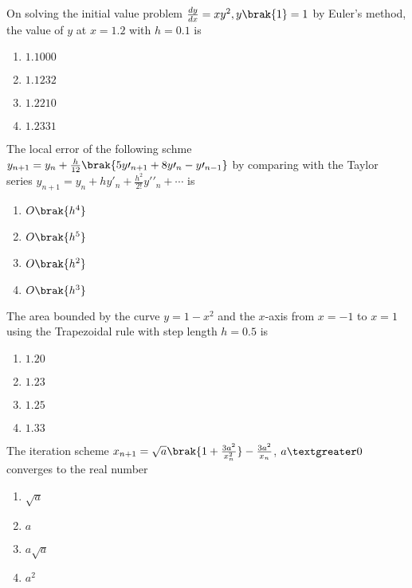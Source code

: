 \item{
On solving the initial value problem $\frac{dy}{dx}=xy^2,y\brak{1}=1$ by Euler's method, the value of $y$ at $x=1.2$ with $h=0.1$ is
\begin{multicols}{4}
\begin{enumerate}
\item $1.1000$
\item $1.1232$
\item $1.2210$
\item $1.2331$
\end{enumerate}
\end{multicols}
}
\item{
The local error of the following schme $y_{n+1}=y_n+\frac{h}{12}\brak{5y\prime_{n+1} + 8y\prime_n - y\prime_{n-1}}$ by comparing with the Taylor series $y_{n+1} = y_n + hy\prime_n + \frac{h^2}{2!}y\prime\prime_n + \cdots$ is 
\begin{multicols}{4}
\begin{enumerate}
\item $O\brak{h^4}$
\item $O\brak{h^5}$
\item $O\brak{h^2}$
\item $O\brak{h^3}$
\end{enumerate}
\end{multicols}
}
\item{
The area bounded by the curve $y=1-x^2$ and the $x$-axis from $x=-1$ to $x=1$ using the Trapezoidal rule with step length $h=0.5$ is
\begin{multicols}{4}
\begin{enumerate}
\item $1.20$
\item $1.23$
\item $1.25$
\item $1.33$
\end{enumerate}
\end{multicols}
}
\item{
The iteration scheme $x_{n+1}=\sqrt{a}\brak{1+\frac{3a^2}{x_n^2}}-\frac{3a^2}{x_n}$, $a\textgreater0$ converges to the real number
\begin{multicols}{4}
\begin{enumerate}
\item $\sqrt{a}$
\item $a$
\item $a\sqrt{a}$
\item $a^2$
\end{enumerate}
\end{multicols}
}
